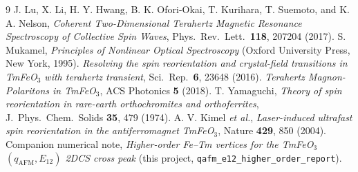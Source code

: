 \documentclass[11pt,a4paper]{article}
\begin{document}
\begin{thebibliography}{9}
 J. Lu, X. Li, H. Y. Hwang, B. K. Ofori-Okai, T. Kurihara,
  T. Suemoto, and K. A. Nelson,
  \emph{Coherent Two-Dimensional Terahertz Magnetic Resonance Spectroscopy of
  Collective Spin Waves}, Phys.\ Rev.\ Lett.\ \textbf{118}, 207204 (2017).
 S. Mukamel, \emph{Principles of Nonlinear Optical
  Spectroscopy} (Oxford University Press, New York, 1995).
 \emph{Resolving the spin reorientation and crystal-field
  transitions in TmFeO$_3$ with terahertz transient},
  Sci.\ Rep.\ \textbf{6}, 23648 (2016).
 \emph{Terahertz Magnon-Polaritons in TmFeO$_3$},
  ACS Photonics \textbf{5} (2018).
 T. Yamaguchi, \emph{Theory of spin reorientation in
  rare-earth orthochromites and orthoferrites},
  J.\ Phys.\ Chem.\ Solids \textbf{35}, 479 (1974).
 A. V. Kimel \emph{et al.}, \emph{Laser-induced ultrafast
  spin reorientation in the antiferromagnet TmFeO$_3$},
  Nature \textbf{429}, 850 (2004).
 Companion numerical note, \emph{Higher-order Fe--Tm vertices
  for the TmFeO$_3$ $(q_{\mathrm{AFM}},E_{12})$ 2DCS cross peak}
  (this project, \texttt{qafm\_e12\_higher\_order\_report}).
\end{thebibliography}
\end{document}

